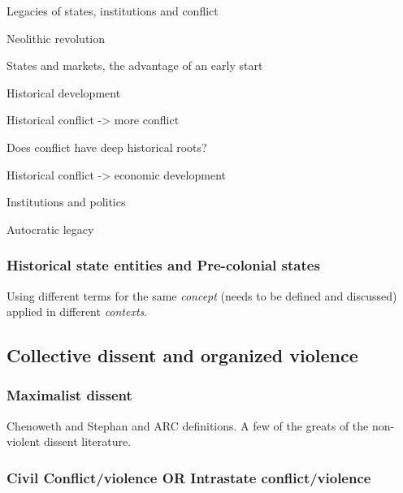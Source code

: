 \documentclass[12pt]{article}
\begin{document}
Legacies of states, institutions and conflict

\citet{Putterman2008} Neolithic revolution

\citet{Bockstette2002} States and markets, the advantage of an early start

\citet{Nunn_2020} Historical development 

\citet{Michalopoulos2018}

\citet{Michalopoulos2016}

\citet{Michalopoulos2013}

\citet{Borcan2018}

\citet{Englebert2000}

\citet{Besley2014} Historical conflict -> more conflict

\citet{Fearon2014} Does conflict have deep historical roots?

\citet{Dincecco2019} Historical conflict -> economic development

\citet{Wilfahrt2018} Institutions and politics

\citet{Wilfahrt_2021}

\citet{Hariri2012} Autocratic legacy

\subsubsection{Historical state entities and Pre-colonial states} \label{Historical state entities and Pre-colonial states}

Using different terms for the same \textit{concept} (needs to be defined and
discussed) applied in different \textit{contexts}.

\subsection{Collective dissent and organized violence} \label{Collective dissent and organized violence}

\subsubsection{Maximalist dissent} \label{Maximalist dissent}

Chenoweth and Stephan and ARC definitions. A few of the greats of the
non-violent dissent literature.

\subsubsection{Civil Conflict/violence OR Intrastate conflict/violence} \label{Civil Conflict}
\end{document}
